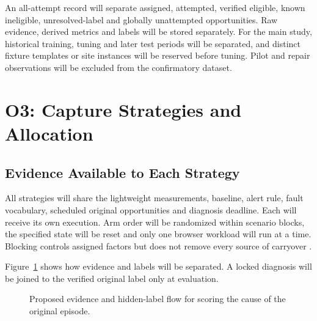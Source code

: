 An all-attempt record will separate assigned, attempted, verified eligible, known ineligible, unresolved-label and globally unattempted opportunities. Raw evidence, derived metrics and labels will be stored separately. For the main study, historical training, tuning and later test periods will be separated, and distinct fixture templates or site instances will be reserved before tuning. Pilot and repair observations will be excluded from the confirmatory dataset.

\section{O3: Capture Strategies and Allocation}
\label{sec:o3-strategies}

\subsection{Evidence Available to Each Strategy}

All strategies will share the lightweight measurements, baseline, alert rule, fault vocabulary, scheduled original opportunities and diagnosis deadline. Each will receive its own execution. Arm order will be randomized within scenario blocks, the specified state will be reset and only one browser workload will run at a time. Blocking controls assigned factors but does not remove every source of carryover \parencite{FBTV2ICM,GJMALCNF}.

Figure~\ref{fig:evidence-chain} shows how evidence and labels will be separated. A locked diagnosis will be joined to the verified original label only at evaluation.

\begin{figure}[htbp]
\centering

\caption{Proposed evidence and hidden-label flow for scoring the cause of the original episode.}
\label{fig:evidence-chain}
\end{figure}

